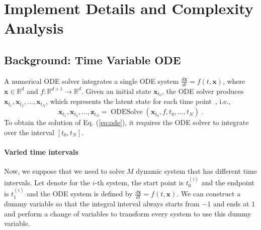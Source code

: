 \section{Implement Details and Complexity Analysis} \label{sec:complex}

\subsection{Background: Time Variable ODE}

A numerical ODE solver integrates a single ODE system $\frac{d \textbf{x}}{d t}=f(t, \textbf{x})$, where $\textbf{x} \in \mathbb{R}^d$ and $f: \mathbb{R}^{d+1} \rightarrow \mathbb{R}^d$. Given an initial state $\textbf{x}_{t_0}$, the ODE solver produces $\textbf{x}_{t_1}, \textbf{x}_{t_2}, ..., \textbf{x}_{t_N}$, which represents the latent state for each time point~\cite{chen2018neural}, i.e.,
\begin{equation}
    \textbf{x}_{t_1}, \textbf{x}_{t_2}, \ldots, \mathbf{z}_{t_N}=\operatorname{ODESolve}\left(\textbf{x}_{t_0}, f, t_0, \ldots, t_N\right) ~.
\label{eq:ode}
\end{equation}
To obtain the solution of Eq. (\ref{eq:ode}), it requires the ODE solver to integrate over the interval $[t_0, t_N]$.

\paragraph{Varied time intervals} Now, we suppose that we need to solve $M$ dynamic system that has different time intervals. Let denote for the $i$-th system, the start point is $t_0^{(i)}$ and the endpoint is $t_1^{(i)}$ and the ODE system is defined by $\frac{d \textbf{x}}{d t}=f(t, \textbf{x})$. We can construct a dummy variable so that the integral interval always starts from $-1$ and ends at $1$ and perform a change of variables to transform every system to use this dummy variable.


